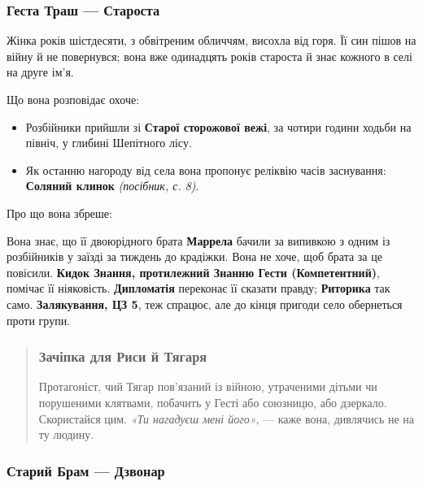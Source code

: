 \documentclass[10pt,a4paper]{article}
\newcommand{\tightlist}{\setlength{\itemsep}{0pt}\setlength{\parskip}{0pt}}
\begin{document}
\subsubsection{Геста Траш --- Староста}\label{ux433ux435ux441ux442ux430-ux442ux440ux430ux448-ux441ux442ux430ux440ux43eux441ux442ux430}

Жінка років шістдесяти, з обвітреним обличчям, висохла від горя. Її син пішов на війну й не повернувся; вона вже одинадцять років староста й знає кожного в селі на друге ім’я.

Що вона розповідає охоче:

\begin{itemize}
\tightlist
\item
  Розбійники прийшли зі \textbf{Старої сторожової вежі}, за чотири години ходьби на північ, у глибині Шепітного лісу.
\item
  Як останню нагороду від села вона пропонує реліквію часів заснування: \textbf{Соляний клинок} \emph{(посібник, с. 8)}.
\end{itemize}

Про що вона збреше:

Вона знає, що її двоюрідного брата \textbf{Маррела} бачили за випивкою з одним із розбійників у заїзді за тиждень до крадіжки. Вона не хоче, щоб брата за це повісили. \textbf{Кидок Знання, протилежний Знанню Гести (Компетентний)}, помічає її ніяковість. \textbf{Дипломатія} переконає її сказати правду; \textbf{Риторика} так само. \textbf{Залякування, ЦЗ 5}, теж спрацює, але до кінця пригоди село обернеться проти групи.

\begin{quote}
\subsubsection{Зачіпка для Риси й Тягаря}\label{ux437ux430ux447ux456ux43fux43aux430-ux434ux43bux44f-ux440ux438ux441ux438-ux439-ux442ux44fux433ux430ux440ux44f}

Протагоніст, чий Тягар пов’язаний із війною, утраченими дітьми чи порушеними клятвами, побачить у Гесті або союзницю, або дзеркало. Скористайся цим. \emph{«Ти нагадуєш мені його»}, --- каже вона, дивлячись не на ту людину.
\end{quote}

\subsubsection{Старий Брам --- Дзвонар}\label{ux441ux442ux430ux440ux438ux439-ux431ux440ux430ux43c-ux434ux437ux432ux43eux43dux430ux440}
\end{document}
